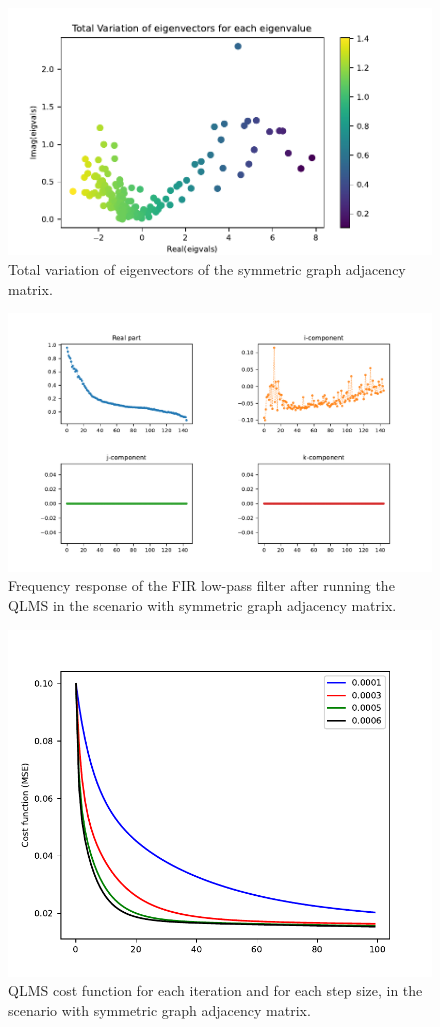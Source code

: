 \begin{figure}
\centering
\includegraphics[width=0.7\linewidth]{thesis/Figures/uk_example/uk_total_variation_symmetric.pdf}
\caption{Total variation of eigenvectors of the symmetric graph adjacency matrix.}
\label{fig:uk_total_variation_symmetric}
\end{figure}


\begin{figure}
\centering
\includegraphics[width=\linewidth]{thesis/Figures/uk_example/uk_qlm_filter_symmetric.pdf}
\caption{Frequency response of the FIR low-pass filter after running the QLMS in the scenario with symmetric graph adjacency matrix.}
\label{fig:uk_qlm_filter_symmetric}
\end{figure}
\renewcommand{\floatpagefraction}{.9}%
\begin{figure}
\centering
\includegraphics[width=0.58\linewidth]{thesis/Figures/uk_example/uk_qlms_iterations_symmetric.pdf}
\caption{QLMS cost function for each iteration and for each step size, in the scenario with symmetric graph adjacency matrix.}
\label{fig:uk_qlms_iterations_symmetric}
\end{figure}

